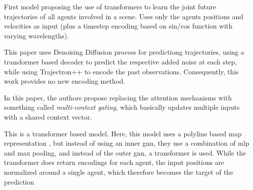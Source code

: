 

\cite{yuan2021agentformer} First model proposing the use of transformers to learn the joint future trajectories of all agents involved in a scene. Uses only the agents positions and velocities as input (plus a timestep encoding based on sin/cos function with varying wavelengths). 



\cite{navarro2022social}


\cite{gu2022stochastic} This paper uses Denoising Diffusion process for predictiong trajectories, using a transformer based decoder to predict the respective added noise at each step, while using Trajectron++ to encode the past observations. Consequently, this work provides no new encoding method.


\cite{varadarajan2022multipath} In this paper, the authors propose replacing the attention mechanisms with something called \textit{multi-context gating}, which basically updates multiple inputs with a shared context vector.


\cite{shi2022motion} This is a transformer based model. Here, this model uses a polyline based map representation \cite{gao2020vectornet}, but instead of using an inner gnn, they use a combination of mlp and max pooling, and instead of the outer gnn, a transformer is used. While the transformer does return encodings for each agent, the input positions are normalized around a single agent, which therefore becomes the target of the prediction



\cite{zhou2023csr}


